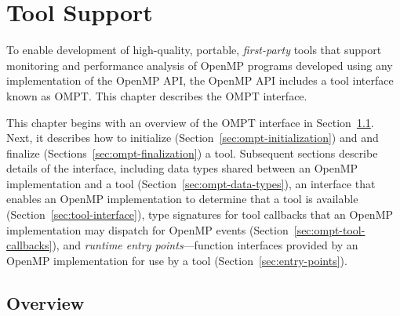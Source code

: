 \newcommand{\ompttype}[1]{\subsubsection{#1}}  %
\newcommand{\ompttoolsignature}[1]{\subsection{#1}}  %
\newcommand{\omptcallbacksignature}[1]{\subsubsection{#1}}  %
\newcommand{\omptruntimeentrypoint}[1]{\subsubsection{#1}}  %
\newcommand{\ompteventswithoutdirectives}[1]{\littleheader{#1}}

\chapter{Tool Support}
\label{chap:ToolsSupport}

To enable development of high-quality, portable, \emph{first-party} tools
that support monitoring and performance analysis of OpenMP programs
developed using any implementation of the OpenMP API, the OpenMP API
includes a tool interface known as OMPT. 
This chapter describes the OMPT interface.

This chapter begins with an overview of the OMPT interface in
Section~\ref{sec:ompt-overview}. Next,
it describes how to initialize (Section~\ref{sec:ompt-initialization}) and 
and finalize (Sections~\ref{sec:ompt-finalization}) a tool.
Subsequent sections describe details of the interface, including
data types shared between an OpenMP implementation and a tool
(Section~\ref{sec:ompt-data-types}), 
an interface that enables an OpenMP implementation to determine that a
tool is available (Section~\ref{sec:tool-interface}),
type signatures for tool callbacks 
that an OpenMP implementation may dispatch for OpenMP events
(Section~\ref{sec:ompt-tool-callbacks}), and 
\emph{runtime entry points}---function interfaces
provided by an OpenMP implementation for use by a tool
(Section~\ref{sec:entry-points}). 

\section{Overview}
\label{sec:ompt-overview}

